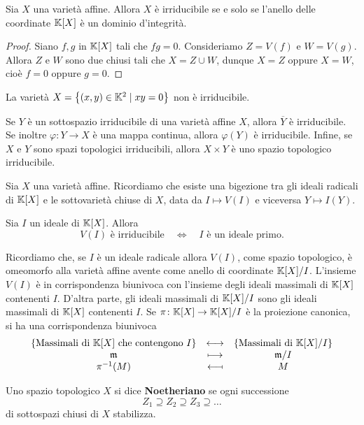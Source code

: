 \begin{proposition}
    Sia $X$ una varietà affine. Allora $X$ è irriducibile se e solo se l'anello delle coordinate $\mathbb{K}[X]$ è un dominio d'integrità.
\end{proposition}

\begin{proof}
    Siano $f,g$ in $\mathbb{K}[X]$ tali che $f g=0$. Consideriamo $Z=V(f)$ e $W=V(g)$. Allora $Z$ e $W$ sono due chiusi tali che $X=Z\cup W$, dunque $X=Z$ oppure $X=W$, cioè $f=0$ oppure $g=0$.
\end{proof}

\begin{example}
    La variet\`a $X=\left\{ (x,y)\in \mathbb{K}^2 \mid xy=0\right\}$ non \`e irriducibile.
\end{example}

\begin{remark}
    Se $Y$ è un sottospazio irriducibile di una varietà affine $X$, allora $\overline{Y}$ è irriducibile. Se inoltre $\varphi\colon Y \to X$ è una mappa continua, allora $\varphi(Y)$ è irriducibile. Infine, se $X$ e $Y$ sono spazi topologici irriducibili, allora $X\times Y$ è uno spazio topologico irriducibile.
\end{remark}

Sia $X$ una varietà affine. Ricordiamo che esiste una bigezione tra gli ideali radicali di $\mathbb{K}[X]$ e le sottovarietà chiuse di $X$, data da $I \mapsto V(I)$ e viceversa $Y\mapsto I(Y)$. 

\begin{remark}
    Sia $I$ un ideale di $\mathbb{K}[X]$. Allora \[V(I) \text{ è irriducibile} \quad \iff \quad I \text{ è un ideale primo.}\]
\end{remark}

Ricordiamo che, se $I$ è un ideale radicale allora $V(I)$, come spazio topologico, è omeomorfo alla varietà affine avente come anello di coordinate $\mathbb{K}[X]/I$. L'insieme $V(I)$ è in corrispondenza biunivoca con l'insieme degli ideali massimali di $\mathbb{K}[X]$ contenenti $I$. D'altra parte, gli ideali massimali di $\mathbb{K}[X]/I$ sono gli ideali massimali di $\mathbb{K}[X]$ contenenti $I$. Se $\pi\colon \mathbb{K}[X]\to \mathbb{K}[X]/I$ è la proiezione canonica, si ha una corrispondenza biunivoca 
\[\begin{array}{ccc} {\left\{ \text{Massimali di $\mathbb{K}[X]$ che contengono $I$}\right\}} & \longleftrightarrow & {\left\{ \text{Massimali di $\mathbb{K}[X]/I$}\right\}}\\ {\mathfrak{m}} & \longmapsto & {\mathfrak{m}/I}\\ {\pi^{-1}(M)} & \longmapsfrom & {M} \end{array}\]


\begin{definition}
    Uno spazio topologico $X$ si dice \textbf{Noetheriano} se ogni successione  \[Z_1\supseteq Z_2 \supseteq Z_3 \supseteq \ldots\]
    di sottospazi chiusi di $X$ stabilizza.
\end{definition}

